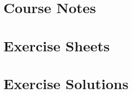 \documentclass[a4paper, oneside, 12pt]{book}
\begin{document}
  \maketitle
  \newpage

  \frontmatter
  \tableofcontents

  

  \mainmatter
  \part{Course Notes}
  

  \part{Exercise Sheets}
  

  \part{Exercise Solutions}
  

  \appendix
  
  
  
\end{document}

